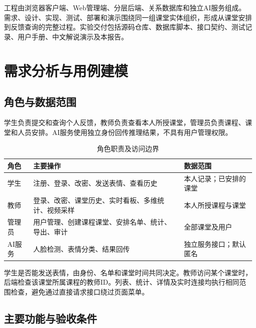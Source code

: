 \documentclass[UTF8,a4paper,zihao=-4,fontset=fandol]{ctexart}
\begin{document}
工程由浏览器客户端、Web管理端、分层后端、关系数据库和独立AI服务组成。需求、设计、实现、测试、部署和演示围绕同一组课堂实体组织，形成从课堂安排到反馈查询的完整过程。实验交付包括源码仓库、数据库脚本、接口契约、测试记录、用户手册、中文解说演示及本报告。

\section{需求分析与用例建模}

\subsection{角色与数据范围}

学生负责提交和查询个人反馈，教师负责查看本人所授课堂，管理员负责课程、课堂和人员安排。AI服务使用独立身份回传推理结果，不具有用户管理权限。

\begin{table}[H]\centering\small
\caption{角色职责及访问边界}
\begin{tabularx}{\textwidth}{p{1.55cm}YY}
\toprule 角色 & 主要操作 & 数据范围\\\midrule
学生 & 注册、登录、改密、发送表情、查看历史 & 本人记录；已安排的课堂\\
教师 & 登录、改密、课堂历史、实时看板、多维统计、视频采样 & 本人所授课程与课堂\\
管理员 & 用户管理、创建课程课堂、安排名单、统计、导出、审计 & 全部课堂及用户\\
AI服务 & 人脸检测、表情分类、结果回传 & 独立服务接口；默认匿名\\
\bottomrule\end{tabularx}\end{table}

学生是否能发送表情，由身份、名单和课堂时间共同决定。教师访问某个课堂时，后端检查该课堂所属课程的教师ID。列表、统计、详情及实时连接均执行相同范围检查，避免通过直接请求接口绕过页面菜单。

\subsection{主要功能与验收条件}
\end{document}
